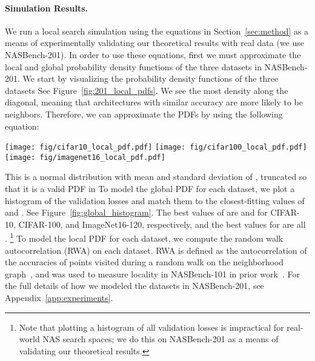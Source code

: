 \documentclass[11pt]{article}
\let\citep\cite
\numberwithin{equation}{section}
\numberwithin{figure}{section}
\theoremstyle{plain}
\theoremstyle{definition}
\begin{document}
\paragraph{Simulation Results.}
We run a local search simulation using the equations in
Section~\ref{sec:method}
as a means of experimentally validating our theoretical results
with real data (we use NASBench-201).
In order to use these equations, first we must approximate the local
and global probability density functions of the three 
datasets in NASBench-201.
We start by visualizing the probability density functions of the three datasets
See Figure~\ref{fig:201_local_pdfs}.
We see the most density along the diagonal, meaning that architectures
with similar accuracy are more likely to be neighbors.
Therefore, we can approximate the PDFs by using the following equation:
\begin{figure*}
\centering \texttt{[image: fig/cifar10\_local\_pdf.pdf]}
\hspace{-3pt}
\texttt{[image: fig/cifar100\_local\_pdf.pdf]}
\hspace{-3pt}
\texttt{[image: fig/imagenet16\_local\_pdf.pdf]}
\caption{
Probability density function for CIFAR-10 (left), CIFAR-100 (middle), and
ImageNet16-120 (right) on NASBench-201. For each coordinate , a darker color indicates
that architectures with accuracy  and  are more likely to be neighbors.
}
\label{fig:201_local_pdfs}
\end{figure*}

This is a normal distribution with mean  
and standard deviation of , truncated so that it is a valid PDF
in 
To model the global PDF for each dataset,
we plot a histogram of the validation losses and match them to the closest-fitting
values of  and .
See Figure~\ref{fig:global_histogram}.
The best values of  are  and  for CIFAR-10, CIFAR-100, 
and ImageNet16-120, respectively, and the best values for  are all .
\footnote{
Note that plotting a histogram of all validation losses is impractical 
for real-world NAS search spaces; we do this on NASBench-201 as a means 
of validating our theoretical results.
}
To model the local PDF for each dataset, we compute
the random walk autocorrelation (RWA) on each dataset.
RWA is defined as the autocorrelation of the accuracies of points visited during a
random walk on the neighborhood 
graph~\citep{weinberger1990correlated, stadler1996landscapes},
and was used to measure locality in NASBench-101 in prior work~\citep{nasbench}.
For the full details of how we modeled the datasets in NASBench-201, 
see Appendix~\ref{app:experiments}.
\end{document}
